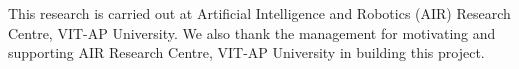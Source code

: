 \documentclass[10pt,twocolumn]{article}
\begin{document}

This research is carried out at Artificial Intelligence and Robotics (AIR) Research Centre, VIT-AP University. We also thank the management for motivating and supporting AIR Research Centre, VIT-AP University in building this project.







\end{document}
